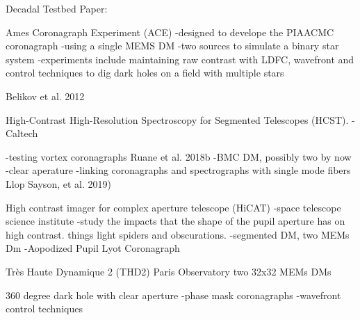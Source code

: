 Decadal Testbed Paper:

Ames Coronagraph Experiment (ACE)
-designed to develope the PIAACMC coronagraph
-using a single MEMS DM
-two sources to simulate a binary star system
-experiments include maintaining raw contrast with LDFC, wavefront and control techniques to dig dark holes on a field with multiple stars

Belikov et al. 2012

High-Contrast High-Resolution Spectroscopy for Segmented Telescopes (HCST).
-Caltech

-testing vortex coronagraphs Ruane et al. 2018b
-BMC DM, possibly two by now
-clear aperature
-linking coronagraphs and spectrographs with single mode fibers
Llop Sayson, et al. 2019)

High contrast imager for complex aperture telescope (HiCAT)
-space telescope science institute
-study the impacts that the shape of the pupil aperture has on high contrast. things light spiders and obscurations. 
-segmented DM, two MEMs Dm
-Aopodized Pupil Lyot Coronagraph

Très Haute Dynamique 2 (THD2)
Paris Observatory
two 32x32 MEMs DMs

360 degree dark hole with clear aperture
-phase mask coronagraphs
-wavefront control techniques



    
        






